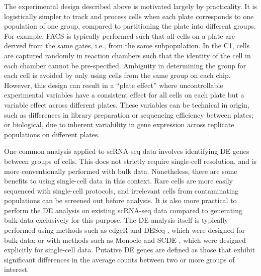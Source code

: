 \documentclass[oupdraft]{bio}
\begin{document}
The experimental design described above is motivated largely by practicality.
It is logistically simpler to track and process cells when each plate corresponds to one population of one group, compared to partitioning the plate into different groups.
For example, FACS is typically performed such that all cells on a plate are derived from the same gates, i.e., from the same subpopulation.
In the C1, cells are captured randomly in reaction chambers such that the identity of the cell in each chamber cannot be pre-specified.
Ambiguity in determining the group for each cell is avoided by only using cells from the same group on each chip.
However, this design can result in a ``plate effect'' where uncontrollable experimental variables have a consistent effect for all cells on each plate but a variable effect across different plates. 
These variables can be technical in origin, such as differences in library preparation or sequencing efficiency between plates; 
    or biological, due to inherent variability in gene expression across replicate populations on different plates.


One common analysis applied to scRNA-seq data involves identifying DE genes between groups of cells.
This does not strictly require single-cell resolution, and is more conventionally performed with bulk data.
Nonetheless, there are some benefits to using single-cell data in this context.
Rare cells are more easily sequenced with single-cell protocols, and irrelevant cells from contaminating populations can be screened out before analysis.
It is also more practical to perform the DE analysis on existing scRNA-seq data compared to generating bulk data exclusively for this purpose.
The DE analysis itself is typically performed using methods such as edgeR \citep{robinson2010edgeR} and DESeq \citep{anders2010differential}, which were designed for bulk data;
    or with methods such as Monocle \citep{trapnell2014dynamics} and SCDE \citep{kharchenko2014bayesian}, which were designed explicitly for single-cell data.
Putative DE genes are defined as those that exhibit significant differences in the average counts between two or more groups of interest.
\end{document}
